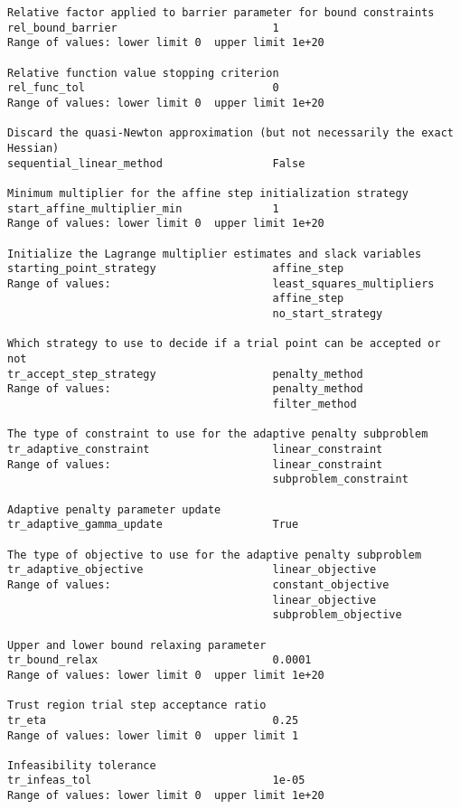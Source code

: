 \documentclass[12pt]{article}
\begin{document}
{\begin{verbatim}
Relative factor applied to barrier parameter for bound constraints
rel_bound_barrier                        1
Range of values: lower limit 0  upper limit 1e+20

Relative function value stopping criterion
rel_func_tol                             0
Range of values: lower limit 0  upper limit 1e+20

Discard the quasi-Newton approximation (but not necessarily the exact Hessian)
sequential_linear_method                 False

Minimum multiplier for the affine step initialization strategy
start_affine_multiplier_min              1
Range of values: lower limit 0  upper limit 1e+20

Initialize the Lagrange multiplier estimates and slack variables
starting_point_strategy                  affine_step
Range of values:                         least_squares_multipliers
                                         affine_step
                                         no_start_strategy

Which strategy to use to decide if a trial point can be accepted or not
tr_accept_step_strategy                  penalty_method
Range of values:                         penalty_method
                                         filter_method

The type of constraint to use for the adaptive penalty subproblem
tr_adaptive_constraint                   linear_constraint
Range of values:                         linear_constraint
                                         subproblem_constraint

Adaptive penalty parameter update
tr_adaptive_gamma_update                 True

The type of objective to use for the adaptive penalty subproblem
tr_adaptive_objective                    linear_objective
Range of values:                         constant_objective
                                         linear_objective
                                         subproblem_objective

Upper and lower bound relaxing parameter
tr_bound_relax                           0.0001
Range of values: lower limit 0  upper limit 1e+20

Trust region trial step acceptance ratio
tr_eta                                   0.25
Range of values: lower limit 0  upper limit 1

Infeasibility tolerance
tr_infeas_tol                            1e-05
Range of values: lower limit 0  upper limit 1e+20


\end{verbatim}}
\end{document}
